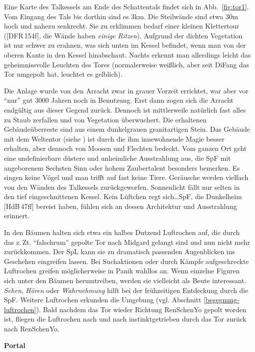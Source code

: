 \documentclass[
a4paper,
twoside,
DIV=calc,
BCOR=4mm,
fontsize=9pt,
twocolumn=on,
titlepage=on,
parskip=half
]{scrartcl}
\begin{document}
Eine Karte des Talkessels am Ende des Schattentals findet sich in
Abb.~\ref{fig:tor1}. Vom Eingang des Tals bis dorthin sind es 3km. Die
Steilwände sind etwa 30m hoch und nahezu senkrecht. Sie zu erklimmen
bedarf einer kleinen Klettertour ([DFR\,154f], die Wände haben
\emph{einige Ritzen}). Aufgrund der dichten Vegetation ist nur schwer
zu erahnen, was sich unten im Kessel befindet, wenn man von der oberen
Kante in den Kessel hinabschaut. Nachts erkennt man allerdings leicht
das geheimnissvolle Leuchten des Tores (normalerweise weißlich, aber
seit DiFang das Tor umgepolt hat, leuchtet es gelblich).

Die Anlage wurde von den Arracht zwar in grauer Vorzeit errichtet, war
aber vor "`nur"' gut 3000 Jahren noch in Benutzung. Erst dann zogen
sich die Arracht endgültig aus dieser Gegend zurück. Dennoch ist
mittlerweile natürlich fast alles zu Staub zerfallen und von
Vegetation überwuchert. Die erhaltenen Gebäudeüberreste sind aus einem
dunkelgrauen granitartigen Stein. Das Gebäude mit dem Weltentor (siehe
) ist durch die ihm innewohnende Magie besser erhalten, aber
dennoch von Moosen und Flechten bedeckt. Vom ganzen Ort geht eine
undefinierbare düstere und unheimliche Ausstrahlung aus, die SpF mit
angeborenem Sechsten Sinn oder hohem Zaubertalent besonders
bemerken. Es singen keine Vögel und man trifft auf fast keine
Tiere. Geräusche werden vielfach von den Wänden des Talkessels
zurückgeworfen. Sonnenlicht fällt nur selten in den tief
eingeschnittenen Kessel. Kein Lüftchen regt sich\dots SpF, die
Dunkelheim [HdB\,47ff] bereist haben, fühlen sich an dessen
Architektur und Ausstrahlung erinnert.

In den Bäumen halten sich etwa ein halbes Dutzend Luftrochen auf, die
durch das z.\,Zt. "`falschrum"' gepolte Tor nach Midgard gelangt sind
und nun nicht mehr zurückkommen. Der SpL kann sie zu dramatisch
passenden Augenblicken ins Geschehen eingreifen lassen. Bei
Suchaktionen oder durch Kämpfe aufgeschreckte Luftrochen greifen
möglicherweise in Panik wahllos an. Wenn einzelne Figuren sich unter
den Bäumen herumtreiben, werden sie vielleicht als Beute
interessant. \emph{Sehen}, \emph{Hören} oder \emph{Wahrnehmung} hilft
bei der frühzeitigen Entdeckung durch die SpF.  Weitere Luftrochen
erkunden die Umgebung (vgl. Abschnitt
\ref{begegnung-luftrochen}). Bald nachdem das Tor wieder Richtung
RenSchenYo gepolt worden ist, fliegen die Luftrochen nach und nach
instinktgetrieben durch das Tor zurück nach RenSchenYo.

\textbf{ Portal}
\end{document}
